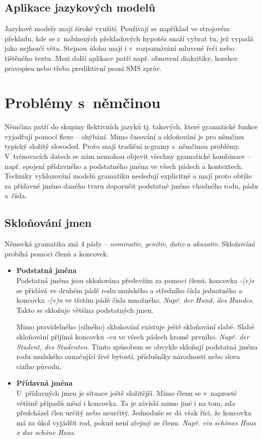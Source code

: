 \documentclass[12pt,a4paper]{report}
\begin{document}
\section{Aplikace jazykových modelů}
Jazykové modely mají široké využití. Používají se například ve strojovém překladu, kde se z~nabízených překladových hypotéz snaží vybrat tu, jež vypadá jako nejhezčí věta. Stejnou úlohu mají i v~rozpoznávání mluvené řeči nebo tištěného textu. Mezi další aplikace patří např. obnovení diakritiky, korekce pravopisu nebo třeba prediktivní psaní SMS zpráv.

\chapter{Problémy s~němčinou}
Němčina patří do skupiny flektivních jazyků tj. takových, které gramatické funkce vyjadřují pomocí flexe -- ohýbání. Mimo časování a skloňování je pro němčinu typický složitý slovosled. Proto mají tradiční n-gramy s~němčinou problémy. V~trénovacích datech se nám nemohou objevit všechny gramatické kombinace -- např. spojení přídavného a podstatného jména ve všech pádech a kontextech. Techniky vyhlazování modelů gramatiku nesledují explicitně a mají proto obtíže za přídavné jméno daného tvaru doporučit podstatné jméno vhodného rodu, pádu a~čísla.

\section{Skloňování jmen}
Německá gramatika zná 4 pády -- \textit{nominativ}, \textit{genitiv}, \textit{dativ} a \textit{akuzativ}. Skloňování probíhá pomocí členů a koncovek. 
\begin{itemize}
\item
\textbf{Podstatná jména}\\
Podstatná jména jsou skloňována především za pomoci členů, koncovka \textit{-(e)s} se přidává ve druhém pádě rodu mužského a středního čísla jednotného a koncovka \textit{-(e)n} ve třetím pádě čísla množného. \textit{Např. der Hund, des Hundes.} Takto se skloňuje většina podstatných jmen.

Mimo pravidelného (silného) skloňování existuje ještě skloňování slabé. Slabé skloňování přijímá koncovku \textit{-en} ve všech pádech kromě prvního. \textit{Např. der Student, des Studenten.} Tímto způsobem se obvykle skloňují podstatná jména rodu mužského označující živé bytosti, příslušníky národností nebo slova cizího původu.

\item
\textbf{Přídavná jména}\\
U~přídavných jmen je situace ještě složitější. Mimo členu se v~naprosté většině případů mění i koncovka. Ta je závislá mimo jiné i na tom, zda předcházel člen určitý nebo neurčitý. Jednoduše se dá však říci, že koncovka má za úkol vyjádřit rod, pokud není zřejmý ze členu. \textit{Např. ein schönes Haus x das schöne Haus.}
\end{itemize}
\end{document}
